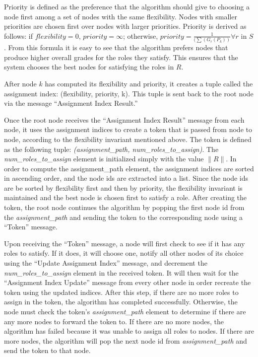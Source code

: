 \documentclass[11pt]{article}
\begin{document}
\begin{multicols}{2}
Priority is defined as the preference that the algorithm should give to choosing a node first among a set of nodes with the same flexibility. Nodes with smaller priorities are chosen first over nodes with larger priorities. Priority is derived as follows: if $flexibility = 0$, $priority = \infty$; otherwise, $priority = \frac{1}{(\displaystyle \sum(G_{r}(P_{k}))} \forall r$ in $S$. From this formula it is easy to see that the algorithm prefers nodes that produce higher overall grades for the roles they satisfy. This ensures that the system chooses the best nodes for satisfying the roles in $R$.

After node $k$ has computed its flexibility and priority, it creates a tuple called the assignment index: (flexibility, priority, k). This tuple is sent back to the root node via the message ``Assignment Index Result.''

Once the root node receives the ``Assignment Index Result'' message from each node, it uses the assignment indices to create a token that is passed from node to node, according to the flexibility invariant mentioned above. The token is defined as the following tuple: \textit{(assignment\_path, num\_roles\_to\_assign)}. The \textit{num\_roles\_to\_assign} element is initialized simply with the value $\|R\|$. In order to compute the assignment\_path element, the assignment indices are sorted in ascending order, and the node ids are extracted into a list. Since the node ids are be sorted by flexibility first and then by priority, the flexibility invariant is maintained and the best node is chosen first to satisfy a role. After creating the token, the root node continues the algorithm by popping the first node id from the \textit{assignment\_path} and sending the token to the corresponding node using a ``Token'' message.

Upon receiving the ``Token'' message, a node will first check to see if it has any roles to satisfy. If it does, it will choose one, notify all other nodes of its choice using the ``Update Assignment Index'' message, and decrement the \textit{num\_roles\_to\_assign} element in the received token. It will then wait for the ``Assignment Index Update'' message from every other node in order recreate the token using the updated indices. After this step, if there are no more roles to assign in the token, the algorithm has completed successfully. Otherwise, the node must check the token's \textit{assignment\_path} element to determine if there are any more nodes to forward the token to. If there are no more nodes, the algorithm has failed because it was unable to assign all roles to nodes. If there are more nodes, the algorithm will pop the next node id from \textit{assignment\_path} and send the token to that node.


\end{multicols}
\end{document}
